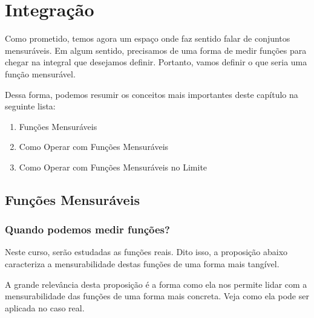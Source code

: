 \chapter{Integração}

Como prometido, temos agora um espaço onde faz sentido falar de conjuntos mensuráveis. Em algum sentido, precisamos de uma forma de medir funções para chegar na integral que desejamos definir. Portanto, vamos definir o que seria uma função mensurável.

Dessa forma, podemos resumir os conceitos mais importantes deste capítulo na seguinte lista:

\begin{enumerate}
    \item Funções Mensuráveis
    \item Como Operar com Funções Mensuráveis
    \item Como Operar com Funções Mensuráveis no Limite
\end{enumerate}















\section{Funções Mensuráveis}
\subsection{Quando podemos medir funções?}

\measurableFunctions

Neste curso, serão estudadas as funções reais. Dito isso, a proposição abaixo caracteriza a mensurabilidade destas funções de uma forma mais tangível.

\measurableFunctionsAndSigmaAlgebrasGeneratedBySet

A grande relevância desta proposição é a forma como ela nos permite lidar com a mensurabilidade das funções de uma forma mais concreta. Veja como ela pode ser aplicada no caso real.

\measurableFunctionsInR


